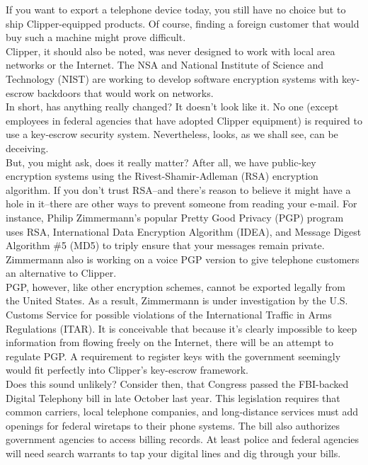 If you want to export a telephone device today, you still have no
choice but to ship Clipper-equipped products. Of course, finding a
foreign customer that would buy such a machine might prove difficult.\\

Clipper, it should also be noted, was never designed to work with local
area networks or the Internet. The NSA and National Institute of
Science and Technology (NIST) are working to develop software
encryption systems with key-escrow backdoors that would work on
networks.\\

In short, has anything really changed? It doesn't look like it. No one
(except employees in federal agencies that have adopted Clipper
equipment) is required to use a key-escrow security system.
Nevertheless, looks, as we shall see, can be deceiving.\\

But, you might ask, does it really matter? After all, we have
public-key encryption systems using the Rivest-Shamir-Adleman (RSA)
encryption algorithm. If you don't trust RSA--and there's reason to
believe it might have a hole in it--there are other ways to prevent
someone from reading your e-mail. For instance, Philip Zimmermann's
popular Pretty Good Privacy (PGP) program uses RSA, International Data
Encryption Algorithm (IDEA), and Message Digest Algorithm \#5 (MD5) to
triply ensure that your messages remain private. Zimmermann also is
working on a voice PGP version to give telephone customers an
alternative to Clipper.\\

PGP, however, like other encryption schemes, cannot be exported legally
from the United States. As a result, Zimmermann is under investigation
by the U.S. Customs Service for possible violations of the
International Traffic in Arms Regulations (ITAR). It is conceivable
that because it's clearly impossible to keep information from flowing
freely on the Internet, there will be an attempt to regulate PGP. A
requirement to register keys with the government seemingly would fit
perfectly into Clipper's key-escrow framework.\\

Does this sound unlikely? Consider then, that Congress passed the
FBI-backed Digital Telephony bill in late October last year. This
legislation requires that common carriers, local telephone companies,
and long-distance services must add openings for federal wiretaps to
their phone systems. The bill also authorizes government agencies to
access billing records. At least police and federal agencies will need
search warrants to tap your digital lines and dig through your bills.

